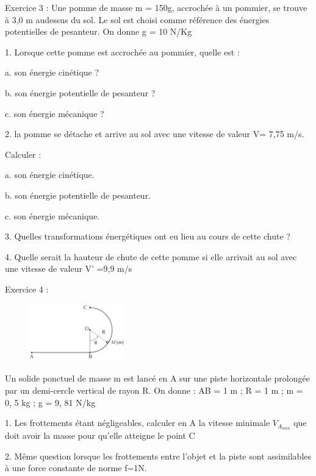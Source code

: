 \documentclass[12pt, french]{article}
\begin{document}
\begin{Box2}{Exercice 3 :}
Une pomme de masse m = 150g, accrochée à un pommier, se trouve à 3,0 m audessus du sol. Le sol est choisi comme référence des énergies potentielles de
pesanteur.
On donne g = 10 N/Kg

1. Lorsque cette pomme est accrochée au pommier, quelle est :
 
  a. son énergie cinétique ?
 
  b. son énergie potentielle de pesanteur ?
 
  c. son énergie mécanique ?

  2. la pomme se détache et arrive au sol avec une vitesse de valeur V= 7,75 m/s.

  Calculer :
 
  a. son énergie cinétique.

  b. son énergie potentielle de pesanteur.
 
  c. son énergie mécanique.

  3. Quelles transformations énergétiques ont eu lieu au cours de cette chute ?

  4. Quelle serait la hauteur de chute de cette pomme si elle arrivait au sol avec une
vitesse de valeur V' =9,9 m/s

\end{Box2}

\begin{Box2}{Exercice 4 : }
\begin{figure}
  \begin{center}
    \includegraphics[width=0.37\textwidth]{./img/img03.png}
  \end{center}
\end{figure}
Un solide ponctuel de masse m est lancé en A sur une piste horizontale prolongée par un demi-cercle vertical de rayon R.
On donne : AB = 1 m ; R = 1 m ; m = 0, 5 kg ; g = 9, 81 N/kg

   1. Les frottements étant négligeables, calculer en A la vitesse minimale $V_{A_{min}}$ que doit avoir la masse pour qu’elle atteigne le point C

   2. Même question lorsque les frottements entre l’objet et la piste sont assimilables à une force constante de norme f=1N.

\end{Box2}
\end{document}
